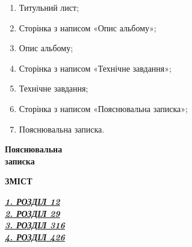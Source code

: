 \documentclass[a4paper,12pt]{article}
\renewcommand{\dstuMainSubtitle}{Технічне завдання}
\begin{document}
  \begin{enumerate}
    \item Титульний лист;
    \item Сторінка з написом «Опис альбому»;
    \item Опис альбому;
    \item Сторінка з написом «Технічне завдання»;
    \item Технічне завдання;
    \item Сторінка з написом «Пояснювальна записка»;
    \item Пояснювальна записка.
  \end{enumerate}

  \newpage

  \dstuPagePlain


  \vspace*{0.45\textheight} %
  \begin{center}
  \textbf{{\fontsize{50pt}{20pt}\selectfont Пояснювальна}}\\[0.5em]
  \textbf{{\fontsize{50pt}{20pt}\selectfont записка}}
  \end{center}
  \vspace*{\fill}

  \newpage

  \dstuPageMain


  \renewcommand{\dstuMainSubtitle}{Пояснювальна записка}
  \renewcommand{\dstuDocCode}{КПІ.ФІОТ.IO4106.003 ПЗ}

  \begin{center}
    \textbf{\Large ЗМІСТ}
  \end{center}

  \hyperref[sec:section1]{\textbf{\textit{1. РОЗДІЛ 1\makebox[12cm][l]{\dotfill}2}}}\\[1em]

  \hyperref[sec:section2]{\textbf{\textit{2. РОЗДІЛ 2\makebox[12cm][l]{\dotfill}9}}}\\[1em]

  \hyperref[sec:section3]{\textbf{\textit{3. РОЗДІЛ 3\makebox[12cm][l]{\dotfill}16}}}\\[1em]

  \hyperref[sec:section4]{\textbf{\textit{4. РОЗДІЛ 4\makebox[12cm][l]{\dotfill}26}}}\\[1em]
\end{document}
